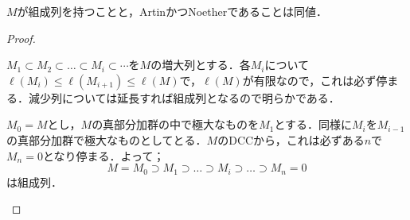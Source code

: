 \begin{prop}\label{prop:有限な組成列の同値条件}
	$M$が組成列を持つことと，ArtinかつNoetherであることは同値．
\end{prop}
\begin{proof}
	\begin{eqv}
		\item 
		$M_1\subset M_2\subset\dots\subset M_i\subset\cdots$を$M$の増大列とする．各$M_i$について$\ell(M_i)\leq\ell(M_{i+1})\leq\ell(M)$で，$\ell(M)$が有限なので，これは必ず停まる．減少列については延長すれば組成列となるので明らかである．
		\item 
		$M_0=M$とし，$M$の真部分加群の中で極大なものを$M_1$とする．同様に$M_i$を$M_{i-1}$の真部分加群で極大なものとしてとる．$M$のDCCから，これは必ずある$n$で$M_n=0$となり停まる．よって；
		\[M=M_0\supset M_1\supset\dots\supset M_i\supset\dots\supset M_n=0\]
		は組成列．
	\end{eqv}
\end{proof}

